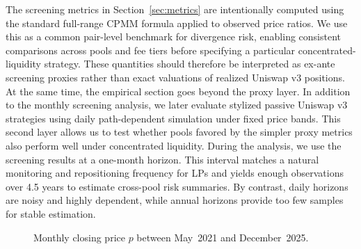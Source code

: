 \documentclass[anonymous]{lipics-v2021}
\begin{document}
{The screening metrics in Section~\ref{sec:metrics} are intentionally computed using the standard full-range CPMM formula applied to observed price ratios. We use this as a common pair-level benchmark for divergence risk, enabling consistent comparisons across pools and fee tiers before specifying a particular concentrated-liquidity strategy. These quantities should therefore be interpreted as ex-ante screening proxies rather than exact valuations of realized Uniswap v3 positions.
At the same time, the empirical section goes beyond the proxy layer. In addition to the monthly screening analysis, we later evaluate stylized passive Uniswap v3 strategies using daily path-dependent simulation under fixed price bands. This second layer allows us to test whether pools favored by the simpler proxy metrics also perform well under concentrated liquidity.
During the analysis, we use the screening results at a one-month horizon. This interval matches a natural monitoring and repositioning frequency for LPs and yields enough observations over 4.5 years to estimate cross-pool risk summaries. By contrast, daily horizons are noisy and highly dependent, while annual horizons provide too few samples for stable estimation.




\begin{figure}[b]
    \centering
    
    \caption{Monthly closing price $p$ between May~2021 and December~2025.}
    \label{fig:monthly_pools_transformed}
\end{figure}

%     

%         

\begin{figure}[t]
\centering

\begin{minipage}[t]{0.49\textwidth}
\centering
\resizebox{\textwidth}{!}{%
    
}
\label{fig:monthly_tvl}
\end{minipage}
\hfill
\begin{minipage}[t]{0.49\textwidth}
\centering
\resizebox{\textwidth}{!}{%
    
}
\label{fig:monthly_pools_volume}
\end{minipage}


\end{figure}}
\end{document}
